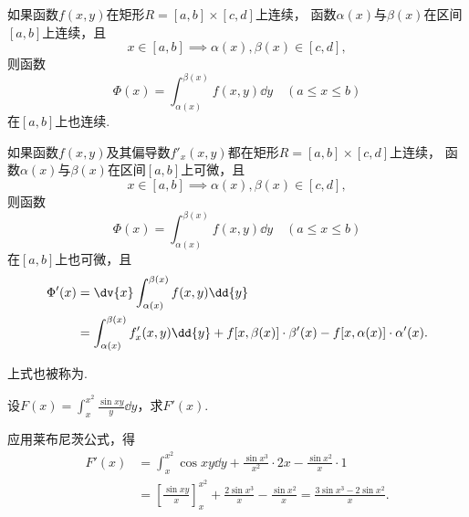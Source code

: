 \begin{theorem}
如果函数\(f(x,y)\)在矩形\(R=[a,b]\times[c,d]\)上连续，
函数\(\alpha(x)\)与\(\beta(x)\)在区间\([a,b]\)上连续，且\begin{equation*}
x \in [a,b] \implies \alpha(x),\beta(x) \in [c,d],
\end{equation*}则函数\begin{equation*}
\Phi(x) = \int_{\alpha(x)}^{\beta(x)} f(x,y)\dd{y}
\quad(a \leq x \leq b)
\end{equation*}在\([a,b]\)上也连续.
\end{theorem}

\begin{theorem}
如果函数\(f(x,y)\)及其偏导数\(f'_x(x,y)\)都在矩形\(R=[a,b]\times[c,d]\)上连续，
函数\(\alpha(x)\)与\(\beta(x)\)在区间\([a,b]\)上可微，且\begin{equation*}
x \in [a,b] \implies \alpha(x),\beta(x) \in [c,d],
\end{equation*}则函数\begin{equation*}
\Phi(x) = \int_{\alpha(x)}^{\beta(x)} f(x,y)\dd{y}
\quad(a \leq x \leq b)
\end{equation*}在\([a,b]\)上也可微，且\begin{align*}
\Phi'(x) &= \dv{x} \int_{\alpha(x)}^{\beta(x)} f(x,y) \dd{y} \\
&= \int_{\alpha(x)}^{\beta(x)} f'_x(x,y) \dd{y}
	+ f[x,\beta(x)] \cdot \beta'(x)
	- f[x,\alpha(x)] \cdot \alpha'(x).
\end{align*}
\end{theorem}
上式也被称为.

\begin{example}
设\(F(x) = \int_x^{x^2} \frac{\sin xy}{y} \dd{y}\)，求\(F'(x)\).
\begin{solution}
应用莱布尼茨公式，得\begin{align*}
	F'(x) &= \int_x^{x^2} \cos xy \dd{y}
	+ \frac{\sin x^3}{x^2} \cdot 2x
	- \frac{\sin x^2}{x} \cdot 1 \\
	&= \left[ \frac{\sin xy}{x} \right]_x^{x^2}
	+ \frac{2 \sin x^3}{x}
	- \frac{\sin x^2}{x}
	= \frac{3 \sin x^3 - 2 \sin x^2}{x}.
\end{align*}
\end{solution}
\end{example}

